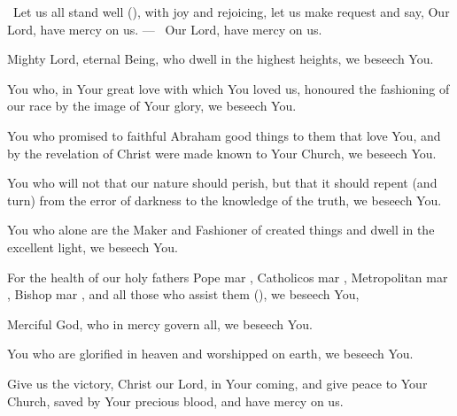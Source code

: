 \documentclass[12pt,twoside,a5paper]{article}
\begin{document}








\dd~Let us all stand well (), with joy and rejoicing, let us make request and say, Our Lord, have mercy on us. --- \rr~Our Lord, have mercy on us. 

\begin{halfparskip}
   Mighty Lord, eternal Being, who dwell in the highest heights, we beseech You.

  You who, in Your great love with which You loved us, honoured the fashioning of our race by the image of Your glory, we beseech You.

  You who promised to faithful Abraham good things to them that love You, and by the revelation of Christ were made known to Your Church, we beseech You.

  You who will not that our nature should perish, but that it should repent (and turn) from the error of darkness to the knowledge of the truth, we beseech You.

  You who alone are the Maker and Fashioner of created things and dwell in the excellent light, we beseech You.
\end{halfparskip}

\begin{halfparskip}
   For the health of our holy fathers Pope mar \NN, Catholicos mar \NN, Metropolitan mar \NN, Bishop mar \NN, and all those who assist them (), we beseech You,

  Merciful God, who in mercy govern all, we beseech You.

  You who are glorified in heaven and worshipped on earth, we beseech You.

  Give us the victory, Christ our Lord, in Your coming, and give peace to Your Church, saved by Your precious blood, and have mercy on us.
\end{halfparskip}
\end{document}
